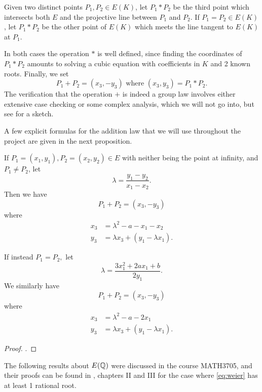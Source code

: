 \documentclass[12pt, a4paper]{report}
\begin{document}
Given two distinct points $P_1, P_2 \in E(K)$, let $P_1 * P_2$ be the third point
which intersects both $E$ and the projective line between $P_1$ and $P_2$. 
If $P_1 = P_2 \in E(K)$, let $P_1 * P_2$ be the other point of $E(K)$ which
meets the line tangent to $E(K)$ at $P_1.$

In both cases the operation $*$ is well defined,
since finding the coordinates of $P_1 * P_2$ amounts to solving
a cubic equation with coefficients in $K$ and 2 known roots.
Finally, we set
\[P_1 + P_2 = (x_3, -y_3) \text{ where } (x_3,y_3) = P_1 * P_2.\]
The verification that the operation $+$ is indeed a group law involves either
extensive case checking or
some complex analysis, which we will not go into, but see
\cite[129-137]{Granville} for a sketch.

A few explicit formulas for the addition law that we will use throughout the project
are given in the next proposition. 

\begin{prop}
  If $P_1 = (x_1,y_1), P_2 = (x_2,y_2) \in E$ with neither being the point at
  infinity, and $P_1 \neq P_2$, let
  $$\lambda = \frac{y_1-y_2}{x_1-x_2}.$$
  Then we have
  \[P_1 + P_2 = (x_3,-y_3)\]
  where
  \begin{equation} \label{eq:adddiff}
    \begin{split}
      x_3 &= \lambda^2 - a - x_1 - x_2 \\
      y_3 &= \lambda x_3 + (y_1 - \lambda x_1).
    \end{split}
  \end{equation}

  If instead $P_1 = P_2,$ let
  \[\lambda = \frac{3x_1^2 + 2ax_1 + b}{2y_1}.\]
  We similarly have
  \[P_1 + P_2 = (x_3,-y_3)\]
  where
  \begin{equation} \label {eq:addsim}
    \begin{split}
      x_3 &= \lambda^2 - a - 2x_1 \\
      y_3 &= \lambda x_3 + (y_1 - \lambda x_1).
    \end{split}
  \end{equation}
\end{prop}
\begin{proof}
  \cite[See][Chapter 1.7, page 34]{koblitz}.
\end{proof}

The following results about $E({\mathbb Q})$ were discussed in the course MATH3705,
and their proofs can be found in \cite{rational}, chapters II and III for the
case where \autoref{eq:weier} has at least 1 rational root.
\end{document}
